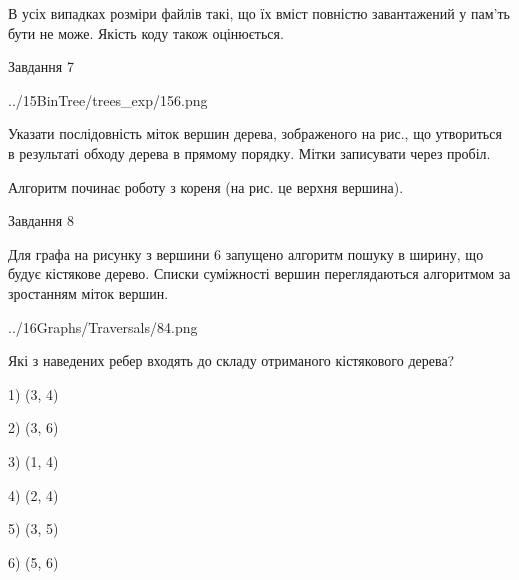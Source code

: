\documentclass[12pt, ukrainian]{article}
\begin{document}
{В усіх випадках розміри файлів такі, що їх вміст повністю завантажений у пам'ть бути не може. Якість коду також оцінюється.



\vspace{10mm}\par

\newpage
\begin{minipage}[t]{9.7cm}
               
{\begin{center}Завдання {7}\end{center}}
\vspace{-4mm}

\begin{center}
	{../15BinTree/trees_exp/156.png}
\end{center}
Указати послідовність міток вершин дерева, зображеного на рис., що утвориться в результаті обходу дерева в прямому порядку. Мітки записувати через пробіл.\par Алгоритм починає роботу з кореня (на рис. це верхня вершина).\par

\end{minipage}
\vline \hspace{8mm}
\begin{minipage}[t]{8.0cm}
               
{\begin{center}Завдання {8}\end{center}}
\vspace{-4mm}
Для графа на рисунку з вершини 6 запущено алгоритм пошуку в ширину, що будує кістякове дерево. Списки суміжності вершин переглядаються алгоритмом за зростанням міток вершин.\par
\begin{center}
	{../16Graphs/Traversals/84.png}
\end{center}
\par Які з наведених ребер входять до складу отриманого кістякового дерева?\par
1) (3, 4)\par
2) (3, 6)\par
3) (1, 4)\par
4) (2, 4)\par
5) (3, 5)\par
6) (5, 6)\par
{\vskip 15pt} \par


\end{minipage}}
\end{document}
